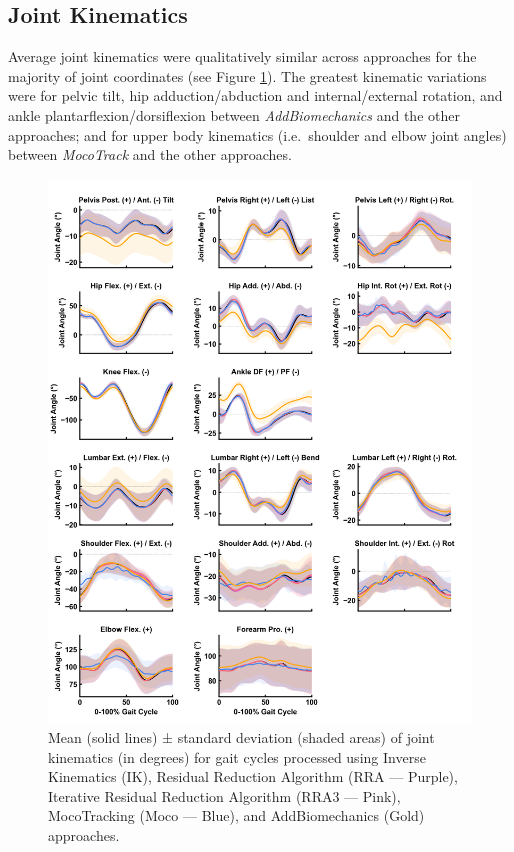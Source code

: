 \documentclass[]{elsarticle} %
\begin{document}
\hypertarget{joint-kinematics}{%
\subsection{Joint Kinematics}\label{joint-kinematics}}

Average joint kinematics were qualitatively similar across approaches
for the majority of joint coordinates (see Figure
\ref{fig:jointKinematics}). The greatest kinematic variations were for
pelvic tilt, hip adduction/abduction and internal/external rotation, and
ankle plantarflexion/dorsiflexion between \emph{AddBiomechanics} and the
other approaches; and for upper body kinematics (i.e.~shoulder and elbow
joint angles) between \emph{MocoTrack} and the other approaches.

\begin{figure}

{\centering \includegraphics[width=1\linewidth]{../results/HamnerDelpDataset/figures/meanKinematics} 

}

\caption{Mean (solid lines) ± standard deviation (shaded areas) of joint kinematics (in degrees) for gait cycles processed using Inverse Kinematics (IK), Residual Reduction Algorithm (RRA — Purple), Iterative Residual Reduction Algorithm  (RRA3 — Pink), MocoTracking (Moco — Blue), and AddBiomechanics (Gold) approaches.}\label{fig:jointKinematics}
\end{figure}
\end{document}
